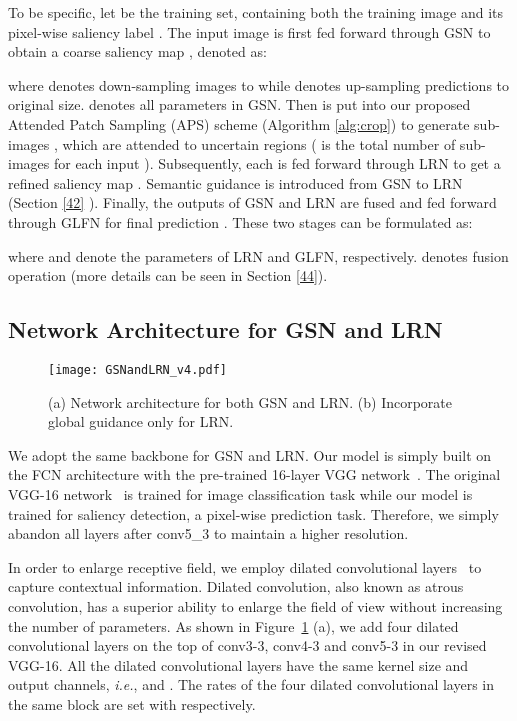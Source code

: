 \documentclass[10pt,twocolumn,letterpaper]{article}
\begin{document}
To be specific, let  be the training set, containing both the training image  and its pixel-wise saliency label . The input image  is first fed forward through GSN to obtain a coarse saliency map , denoted as:

where  denotes down-sampling images to  while  denotes up-sampling predictions to original size.  denotes all parameters in GSN. Then  is put into our proposed Attended Patch Sampling (APS) scheme (Algorithm \ref{alg:crop}) to generate sub-images , which are attended to uncertain regions ( is the total number of sub-images for each input ). Subsequently, each  is fed forward through LRN to get a refined saliency map . Semantic guidance is introduced from GSN to LRN (Section \ref{42} ). Finally, the outputs of GSN and LRN are fused and fed forward through GLFN for final prediction . These two stages can be formulated as:


where  and  denote the parameters of LRN and GLFN, respectively.  denotes fusion operation (more details can be seen in Section \ref{44}).

\subsection{Network Architecture for GSN and LRN}
  \vspace{-2mm}
\begin{figure}[h]
  \centering
\texttt{[image: GSNandLRN\_v4.pdf]}\\
  \caption{(a) Network architecture for both GSN and LRN. (b) Incorporate global guidance only for LRN.}
  \label{gsnandlrn}
  \vspace{-2mm}
\end{figure}
We adopt the same backbone for GSN and LRN.
Our model is simply built on the FCN architecture with the pre-trained 16-layer VGG network~\cite{simonyan2014very}. The original VGG-16 network~\cite{simonyan2014very} is trained for image classification task while our model is trained for saliency detection, a pixel-wise prediction task. Therefore, we simply abandon all layers after conv5\_3 to maintain a higher resolution.

In order to enlarge receptive field, we employ dilated convolutional layers~\cite{yu2015multi} to capture contextual information. Dilated convolution, also known as atrous convolution, has a superior ability to enlarge the field of view without increasing the number of parameters. As shown in Figure~\ref{gsnandlrn} (a), we add four dilated convolutional layers on the top of conv3-3, conv4-3 and conv5-3 in our revised VGG-16. All the dilated convolutional layers have the same kernel size and output channels, \emph{i.e.},  and . The rates of the four dilated convolutional layers in the same block are set with  respectively.
\end{document}

